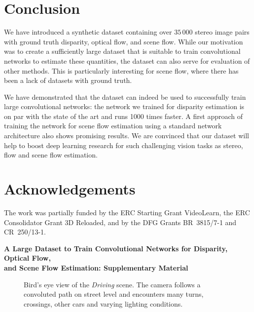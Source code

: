 \documentclass[10pt,twocolumn,letterpaper]{article}
\begin{document}
\section{Conclusion}\label{sec:conclusion}
We have introduced a  synthetic dataset containing over $35\,000$ stereo image pairs with ground truth disparity, optical flow, and scene flow. While our motivation was to create a sufficiently large dataset that is suitable to train convolutional networks to estimate these quantities, the dataset can also serve for evaluation of other methods. This is particularly interesting for scene flow, where there has been a lack of datasets with ground truth.

We have demonstrated that the dataset can indeed be used to successfully train large convolutional networks: the network we trained for disparity estimation is on par with the state of the art and runs 1000 times faster. 
A first approach of training the network for scene flow estimation using a standard network architecture also shows promising results.  We are convinced that our dataset will help to boost deep learning research for such challenging vision tasks as stereo, flow and scene flow estimation.



\section{Acknowledgements}\label{sec:acknowledgements}
The work was partially funded by the ERC Starting Grant VideoLearn, the ERC Consolidator Grant 3D Reloaded, and by the DFG Grants \mbox{BR 3815/7-1} and \mbox{CR 250/13-1}.


{\small


}


\begin{figure*}%
  \begin{center}%
    \textbf{\Large A Large Dataset to Train Convolutional Networks for Disparity, Optical Flow,\\\vspace{.25cm} and Scene Flow Estimation: Supplementary Material}
  \end{center}%
\end{figure*}%




\pagebreak



\setcounter{section}{0}
\setcounter{figure}{0}
\setcounter{footnote}{0}


\begin{figure}%
  \begin{center}%
  {%
  }%
  \end{center}%
  \caption{Bird's eye view of the \emph{Driving} scene. 
           The camera follows a convoluted path on street level and encounters many turns, crossings, other cars and varying lighting conditions.
          }
  \label{fig:fakekitti_birdseye}%
\end{figure}%
\end{document}
